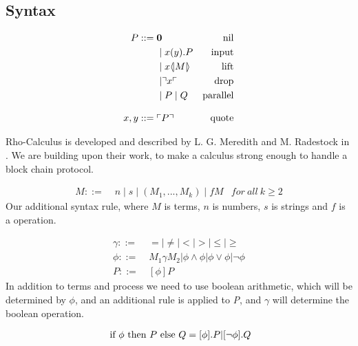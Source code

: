 \subsection{Syntax}
\begin{align*}
    P  ::= \; &  \mathbf{0} & \text{nil} \\
      & \mid x(y).P & \text{input} \\
      & \mid x \langle \! | M | \! \rangle & \text{lift} \\
      & \mid \urcorner x \ulcorner & \text{drop} \\
      & \mid P \mid Q & \text{parallel} \\[3mm]
    x,y ::= \; & \ulcorner P \urcorner & \text{quote}\\
\end{align*}

Rho-Calculus is developed and described by L. G. Meredith and M. Radestock in \citep{Meredith2005}. We are building upon their work, to make a calculus strong enough to handle a block chain protocol.

\begin{align*}
M::=\; & n \mid s \mid (M_1,...,M_k) \mid fM &for\ all\ k \geq 2
\end{align*}
Our additional syntax rule, where $M$ is terms, $n$ is numbers, $s$ is strings and $f$ is a operation.

\begin{align*}
\gamma ::=& \ =|\neq|<|>|\leq|\geq\\
\phi ::=& \ M_1\gamma M_2|\phi\land\phi|\phi\lor\phi|\neg\phi\\
P::=& \ [\phi] P
\end{align*}
In addition to terms and process we need to use boolean arithmetic, which will be determined by \ensuremath{\phi}, and an additional rule is applied to \textit{P}, and \ensuremath{\gamma} will determine the boolean operation.

\begin{align*}
	\text{ if }\phi\text{ then }P\text{ else }Q = [\phi].P | [\neg \phi].Q
\end{align*}